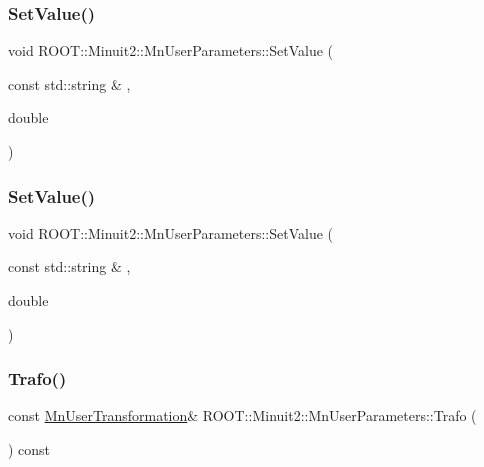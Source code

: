 \subsubsection{\texorpdfstring{SetValue()}{SetValue()}\hspace{0.1cm}{\footnotesize\ttfamily [5/6]}}
{\footnotesize\ttfamily void R\+O\+O\+T\+::\+Minuit2\+::\+Mn\+User\+Parameters\+::\+Set\+Value (\begin{DoxyParamCaption}\item[{const std\+::string \&}]{,  }\item[{double}]{ }\end{DoxyParamCaption})}

\mbox{\label{classROOT_1_1Minuit2_1_1MnUserParameters_a83c0197f87bd6722f0ddfed4bf406fbe}} 
\subsubsection{\texorpdfstring{SetValue()}{SetValue()}\hspace{0.1cm}{\footnotesize\ttfamily [6/6]}}
{\footnotesize\ttfamily void R\+O\+O\+T\+::\+Minuit2\+::\+Mn\+User\+Parameters\+::\+Set\+Value (\begin{DoxyParamCaption}\item[{const std\+::string \&}]{,  }\item[{double}]{ }\end{DoxyParamCaption})}

\mbox{\label{classROOT_1_1Minuit2_1_1MnUserParameters_ac5c3bff96b6fc41a790005f524e334db}} 
\subsubsection{\texorpdfstring{Trafo()}{Trafo()}\hspace{0.1cm}{\footnotesize\ttfamily [1/3]}}
{\footnotesize\ttfamily const \mbox{\hyperlink{classROOT_1_1Minuit2_1_1MnUserTransformation}{Mn\+User\+Transformation}}\& R\+O\+O\+T\+::\+Minuit2\+::\+Mn\+User\+Parameters\+::\+Trafo (\begin{DoxyParamCaption}{ }\end{DoxyParamCaption}) const\hspace{0.3cm}{\ttfamily [inline]}}

